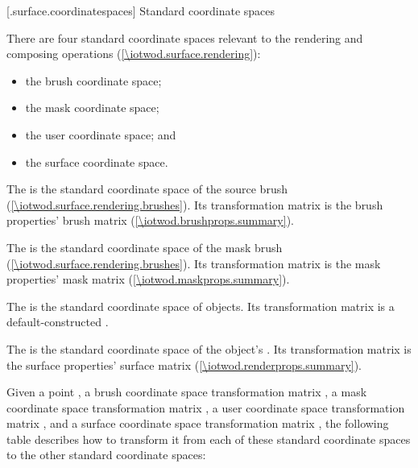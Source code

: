  [\iotwod.surface.coordinatespaces] {Standard coordinate spaces}

\pnum
There are four standard coordinate spaces relevant to the rendering and composing operations (\ref{\iotwod.surface.rendering}):
\begin{itemize}
\item the brush coordinate space;
\item the mask coordinate space;
\item the user coordinate space; and
\item the surface coordinate space.
\end{itemize}

\pnum
The  is the standard coordinate space of the source brush (\ref{\iotwod.surface.rendering.brushes}). Its transformation matrix is the brush properties' brush matrix (\ref{\iotwod.brushprops.summary}).

\pnum
The  is the standard coordinate space of the mask brush (\ref{\iotwod.surface.rendering.brushes}). Its transformation matrix is the mask properties' mask matrix (\ref{\iotwod.maskprops.summary}).

\pnum
The  is the standard coordinate space of  objects. Its transformation matrix is a default-constructed .

\pnum
The  is the standard coordinate space of the  object's \underlyingsurface. Its transformation matrix is the surface properties' surface matrix (\ref{\iotwod.renderprops.summary}).

\pnum
Given a point , a brush coordinate space transformation matrix , a mask coordinate space transformation matrix , a user coordinate space transformation matrix , and a surface coordinate space transformation matrix , the following table describes how to transform it from each of these standard coordinate spaces to the other standard coordinate spaces:

